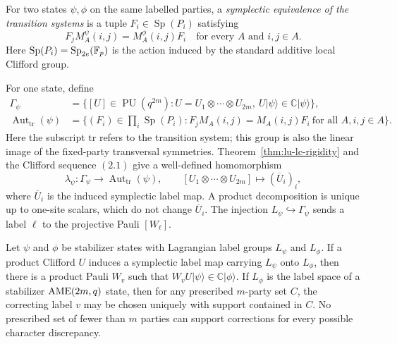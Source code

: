 For two states \(\psi,\phi\) on the same labelled parties, a
\emph{symplectic equivalence of the transition systems} is a tuple
\(F_i\in\operatorname{Sp}(P_i)\) satisfying
\begin{equation}
 F_jM_A^\psi(i,j)=M_A^\phi(i,j)F_i
 \quad\text{for every \(A\) and \(i,j\in A\)}.           \label{eq:atlas-frame-compatibility}
\end{equation}
Here
\(\operatorname{Sp}(P_i)=\operatorname{Sp}_{2e}(\mathbb F_p)\) is the action
induced by the standard
additive local Clifford group.

For one state, define
\[
\begin{split}
 \Gamma_\psi
  &=\{[U]\in\operatorname{PU}(q^{2m}):
       U=U_1\otimes\cdots\otimes U_{2m},\
       U\lvert\psi\rangle\in\mathbb C\lvert\psi\rangle\},\\
 \operatorname{Aut}_{\mathrm{tr}}(\psi)
  &=\{(F_i)\in\prod_i\operatorname{Sp}(P_i):
       F_jM_A(i,j)=M_A(i,j)F_i\ \text{for all }A,i,j\in A\}.
\end{split}
\]
Here the subscript \(\mathrm{tr}\) refers to the transition system; this
group is also the linear image of the fixed-party transversal symmetries.
Theorem~\ref{thm:lu-lc-rigidity} and the Clifford sequence \((2.1)\)
give a well-defined homomorphism
\[
 \lambda_\psi:\Gamma_\psi\longrightarrow
 \operatorname{Aut}_{\mathrm{tr}}(\psi),\qquad
 [U_1\otimes\cdots\otimes U_{2m}]\longmapsto(\overline U_i)_i,
\]
where \(\overline U_i\) is the induced symplectic label map.  A product
decomposition is unique up to one-site scalars, which do not change
\(\overline U_i\).  The injection
\(L_\psi\hookrightarrow\Gamma_\psi\) sends a label
\(\ell\) to the projective Pauli \([W_\ell]\).

\begin{lemma}\label{lem:pauli-phase-correction}
Let \(\psi\) and \(\phi\) be stabilizer states with Lagrangian label groups
\(L_\psi\) and \(L_\phi\).  If a product Clifford \(U\) induces a
symplectic label map carrying \(L_\psi\) onto \(L_\phi\), then there is a
product Pauli \(W_v\) such that
\(W_vU\lvert\psi\rangle\in\mathbb C\lvert\phi\rangle\).
If \(L_\phi\) is the label space of a stabilizer \(\mathrm{AME}(2m,q)\) state,
then for any prescribed \(m\)-party set \(C\), the correcting label
\(v\) may be chosen uniquely with support contained in \(C\).  No prescribed
set of fewer than \(m\) parties can support corrections for every possible
character discrepancy.
\end{lemma}

